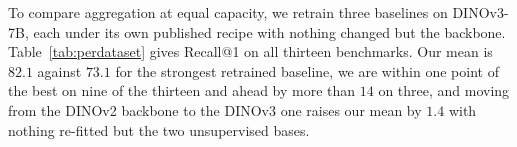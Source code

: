 \label{sec:exp-vs}
\label{sec:burden}
\label{sec:scale}

To compare aggregation at equal capacity, we retrain three baselines on DINOv3-7B, each under its own published recipe with nothing changed but the backbone. Table~\ref{tab:perdataset} gives Recall@1 on all thirteen benchmarks. Our mean is $82.1$ against $73.1$ for the strongest retrained baseline, we are within one point of the best on nine of the thirteen and ahead by more than $14$ on three, and moving from the DINOv2 backbone to the DINOv3 one raises our mean by $1.4$ with nothing re-fitted but the two unsupervised bases.

\begin{table}[t]
\caption{\textbf{Matched-backbone comparison, per dataset.} R@1 on the thirteen benchmarks: \emph{v2} is a DINOv2 backbone, \emph{v3} a DINOv3 one: for the baselines their published backbone and a retraining on DINOv3-7B, for us DINOv2-G and DINOv3-7B, both frozen. \emph{Dim} is the first-stage descriptor dimensionality. $\Delta$ $=$ our \emph{v3} minus the best baseline on that benchmark. Bold $=$ best, \underline{underline} $=$ second, over all rows. Our runs.}
\label{tab:perdataset}
\centering
{\scriptsize\setlength{\tabcolsep}{2.6pt}%
}
\end{table}
